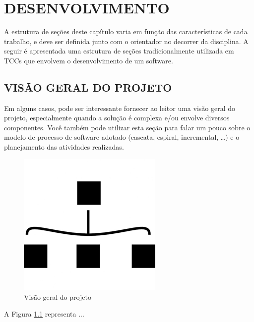 \chapter{DESENVOLVIMENTO} \label{cap:desenvolvimento}

A estrutura de seções deste capítulo varia em função das características de cada trabalho, e deve ser definida junto com o orientador no decorrer da disciplina. A seguir é apresentada uma estrutura de seções tradicionalmente utilizada em TCCs que envolvem o desenvolvimento de um software. 


\section{VISÃO GERAL DO PROJETO}\label{sec:visao}

Em alguns casos, pode ser interessante fornecer ao leitor uma visão geral do projeto, especialmente quando a solução é complexa e/ou envolve diversos componentes. Você também pode utilizar esta seção para falar um pouco sobre o modelo de processo de software adotado (cascata, espiral, incremental, …) e o planejamento das atividades realizadas.

\begin{figure}[htb]
	\begin{center}
		\includegraphics{images/figura1.png}
	\end{center}
	\caption{\label{fig:Fig_1}Visão geral do projeto}
\end{figure}

A Figura \ref{fig:Fig_1} representa ...

